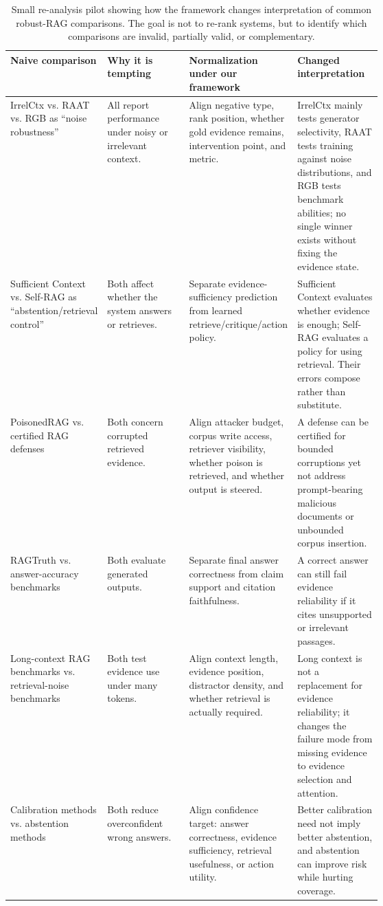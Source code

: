 \begin{table}[t]
\centering
\scriptsize
\renewcommand{\arraystretch}{0.88}
\begin{tabularx}{\linewidth}{>{\raggedright\arraybackslash}p{0.16\linewidth}>{\raggedright\arraybackslash}p{0.22\linewidth}>{\raggedright\arraybackslash}p{0.25\linewidth}X}
\toprule
\textbf{Naive comparison} & \textbf{Why it is tempting} & \textbf{Normalization under our framework} & \textbf{Changed interpretation} \\
\midrule
IrrelCtx vs. RAAT vs. RGB as ``noise robustness'' & All report performance under noisy or irrelevant context. & Align negative type, rank position, whether gold evidence remains, intervention point, and metric. & IrrelCtx mainly tests generator selectivity, RAAT tests training against noise distributions, and RGB tests benchmark abilities; no single winner exists without fixing the evidence state. \\
Sufficient Context vs. Self-RAG as ``abstention/retrieval control'' & Both affect whether the system answers or retrieves. & Separate evidence-sufficiency prediction from learned retrieve/critique/action policy. & Sufficient Context evaluates whether evidence is enough; Self-RAG evaluates a policy for using retrieval. Their errors compose rather than substitute. \\
PoisonedRAG vs. certified RAG defenses & Both concern corrupted retrieved evidence. & Align attacker budget, corpus write access, retriever visibility, whether poison is retrieved, and whether output is steered. & A defense can be certified for bounded corruptions yet not address prompt-bearing malicious documents or unbounded corpus insertion. \\
RAGTruth vs. answer-accuracy benchmarks & Both evaluate generated outputs. & Separate final answer correctness from claim support and citation faithfulness. & A correct answer can still fail evidence reliability if it cites unsupported or irrelevant passages. \\
Long-context RAG benchmarks vs. retrieval-noise benchmarks & Both test evidence use under many tokens. & Align context length, evidence position, distractor density, and whether retrieval is actually required. & Long context is not a replacement for evidence reliability; it changes the failure mode from missing evidence to evidence selection and attention. \\
Calibration methods vs. abstention methods & Both reduce overconfident wrong answers. & Align confidence target: answer correctness, evidence sufficiency, retrieval usefulness, or action utility. & Better calibration need not imply better abstention, and abstention can improve risk while hurting coverage. \\
\bottomrule
\end{tabularx}
\caption{Small re-analysis pilot showing how the framework changes interpretation of common robust-RAG comparisons. The goal is not to re-rank systems, but to identify which comparisons are invalid, partially valid, or complementary.}
\label{tab:comparison-reanalysis-pilot}
\end{table}

